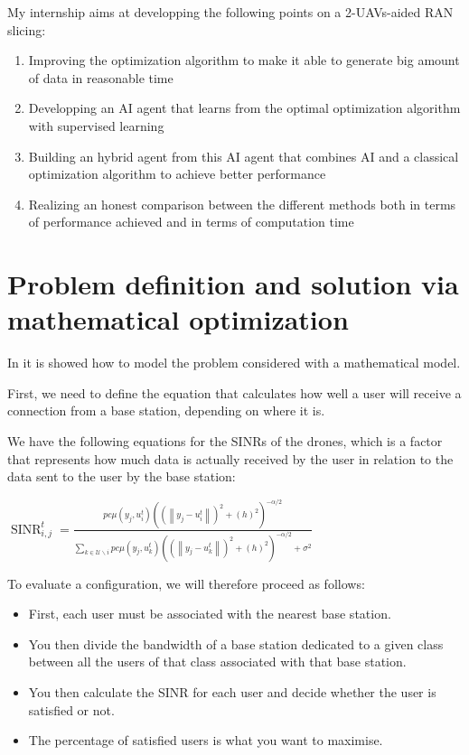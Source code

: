 \documentclass[letterpaper]{article}
\begin{document}
\;

My internship aims at developping the following points on a 2-UAVs-aided RAN slicing:

\begin{enumerate}
    \item Improving the optimization algorithm to make it able to generate big amount of data in reasonable time
    \item Developping an AI agent that learns from the optimal optimization algorithm with supervised learning
    \item Building an hybrid agent from this AI agent that combines AI and a classical optimization algorithm to achieve better performance
    \item Realizing an honest comparison between the different methods both in terms of performance achieved and in terms of computation time
\end{enumerate}


\section{Problem definition and solution via mathematical optimization}

\label{optimization}


In \cite{main_article} it is showed how to model the problem considered with a mathematical model.

First, we need to define the equation that calculates how well a user will receive a connection from a base station, depending on where it is.

We have the following equations for the SINRs of the drones, which is a factor that represents how much data is actually received by the user in relation to the data sent to the user by the base station:

$\operatorname{SINR}_{i, j}^t=\frac{p c \mu\left(y_j, u_i^t\right)\left(\left(\left\|y_j-u_i^t\right\|\right)^2+\left(h\right)^2\right)^{-\alpha / 2}}{\sum\limits_{k \in \mathcal{U} \backslash i} p c \mu\left(y_j, u_k^t\right)\left(\left(\left\|y_j-u_k^t\right\|\right)^2+\left(h\right)^2\right)^{-\alpha / 2}+\sigma^2}$

To evaluate a configuration, we will therefore proceed as follows:

\begin{itemize}
    \item First, each user must be associated with the nearest base station.
    \item You then divide the bandwidth of a base station dedicated to a given class between all the users of that class associated with that base station.
    \item You then calculate the SINR for each user and decide whether the user is satisfied or not.
    \item The percentage of satisfied users is what you want to maximise.
\end{itemize}
\end{document}
